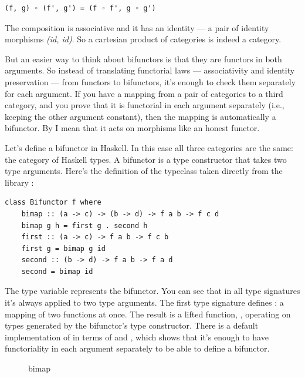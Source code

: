 \begin{verbatim}
(f, g) ◦ (f', g') = (f ◦ f', g ◦ g')
\end{verbatim}
The composition is associative and it has an identity --- a pair of
identity morphisms \emph{(id, id)}. So a cartesian product of categories
is indeed a category.

But an easier way to think about bifunctors is that they are functors in
both arguments. So instead of translating functorial laws ---
associativity and identity preservation --- from functors to bifunctors,
it's enough to check them separately for each argument. If you have a
mapping from a pair of categories to a third category, and you prove
that it is functorial in each argument separately (i.e., keeping the
other argument constant), then the mapping is automatically a bifunctor.
By  I mean that it acts on morphisms like an honest
functor.

Let's define a bifunctor in Haskell. In this case all three categories
are the same: the category of Haskell types. A bifunctor is a type
constructor that takes two type arguments. Here's the definition of the
 typeclass taken directly from the library
:

\begin{verbatim}
class Bifunctor f where 
    bimap :: (a -> c) -> (b -> d) -> f a b -> f c d
    bimap g h = first g . second h
    first :: (a -> c) -> f a b -> f c b
    first g = bimap g id
    second :: (b -> d) -> f a b -> f a d
    second = bimap id
\end{verbatim}
The type variable  represents the bifunctor. You can see that
in all type signatures it's always applied to two type arguments. The
first type signature defines : a mapping of two functions
at once. The result is a lifted function,
, operating on types
generated by the bifunctor's type constructor. There is a default
implementation of  in terms of  and
, which shows that it's enough to have functoriality in
each argument separately to be able to define a bifunctor.

\begin{figure}[H]
\centering
{}
\caption{bimap}
\end{figure}

